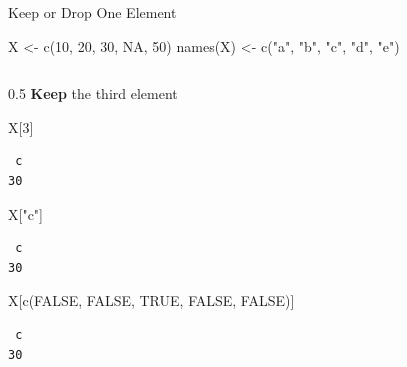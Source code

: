 \documentclass[
  ignorenonframetext,
  aspectratio=169,
]{beamer}
\newenvironment{Shaded}{\begin{snugshade}}{\end{snugshade}}
\newcommand{\ConstantTok}[1]{\textcolor[rgb]{0.56,0.35,0.01}{#1}}
\newcommand{\DecValTok}[1]{\textcolor[rgb]{0.68,0.00,0.00}{#1}}
\newcommand{\FunctionTok}[1]{\textcolor[rgb]{0.28,0.35,0.67}{#1}}
\newcommand{\NormalTok}[1]{\textcolor[rgb]{0.00,0.23,0.31}{#1}}
\newcommand{\OtherTok}[1]{\textcolor[rgb]{0.00,0.23,0.31}{#1}}
\newcommand{\StringTok}[1]{\textcolor[rgb]{0.13,0.47,0.30}{#1}}
\begin{document}
\begin{frame}[fragile]{Keep or Drop One Element}
\protect\hypertarget{keep-or-drop-one-element}{}
\begin{Shaded}
\begin{Highlighting}[]
\NormalTok{X }\OtherTok{\textless{}{-}} \FunctionTok{c}\NormalTok{(}\DecValTok{10}\NormalTok{, }\DecValTok{20}\NormalTok{, }\DecValTok{30}\NormalTok{, }\ConstantTok{NA}\NormalTok{, }\DecValTok{50}\NormalTok{)}
\FunctionTok{names}\NormalTok{(X) }\OtherTok{\textless{}{-}} \FunctionTok{c}\NormalTok{(}\StringTok{"a"}\NormalTok{, }\StringTok{"b"}\NormalTok{, }\StringTok{"c"}\NormalTok{, }\StringTok{"d"}\NormalTok{, }\StringTok{"e"}\NormalTok{)}
\end{Highlighting}
\end{Shaded}

\begin{columns}[T]
\begin{column}{0.5\textwidth}
\textbf{Keep} the third element

\begin{Shaded}
\begin{Highlighting}[]
\NormalTok{X[}\DecValTok{3}\NormalTok{]}
\end{Highlighting}
\end{Shaded}

\begin{verbatim}
 c 
30 
\end{verbatim}

\begin{Shaded}
\begin{Highlighting}[]
\NormalTok{X[}\StringTok{"c"}\NormalTok{]}
\end{Highlighting}
\end{Shaded}

\begin{verbatim}
 c 
30 
\end{verbatim}

\begin{Shaded}
\begin{Highlighting}[]
\NormalTok{X[}\FunctionTok{c}\NormalTok{(}\ConstantTok{FALSE}\NormalTok{, }\ConstantTok{FALSE}\NormalTok{, }\ConstantTok{TRUE}\NormalTok{, }\ConstantTok{FALSE}\NormalTok{, }\ConstantTok{FALSE}\NormalTok{)]}
\end{Highlighting}
\end{Shaded}

\begin{verbatim}
 c 
30 
\end{verbatim}
\end{column}


\end{columns}
\end{frame}
\end{document}
